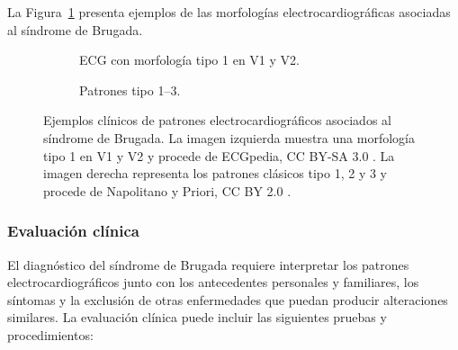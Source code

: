 La Figura~\ref{fig:brugada_clinical_examples} presenta ejemplos de las morfologías electrocardiográficas asociadas al síndrome de Brugada.

\begin{figure}[H]
  \centering
  \begin{subfigure}[t]{0.58\textwidth}
    \centering
    \caption{ECG con morfología tipo 1 en V1 y V2.}
  \end{subfigure}
  \hfill
  \begin{subfigure}[t]{0.34\textwidth}
    \centering
    \caption{Patrones tipo 1--3.}
  \end{subfigure}
  \caption{Ejemplos clínicos de patrones electrocardiográficos asociados al síndrome de Brugada. La imagen izquierda muestra una morfología tipo 1 en V1 y V2 y procede de ECGpedia, CC BY-SA 3.0 \cite{ecgpediaType1Image}. La imagen derecha representa los patrones clásicos tipo 1, 2 y 3 y procede de Napolitano y Priori, CC BY 2.0 \cite{napolitano2006}.}
  \label{fig:brugada_clinical_examples}
\end{figure}

\clearpage
\subsubsection{Evaluación clínica}
\label{sec:evaluacion_clinica}

El diagnóstico del síndrome de Brugada requiere interpretar los patrones electrocardiográficos junto con los antecedentes personales y familiares, los síntomas y la exclusión de otras enfermedades que puedan producir alteraciones similares. La evaluación clínica puede incluir las siguientes pruebas y procedimientos:

